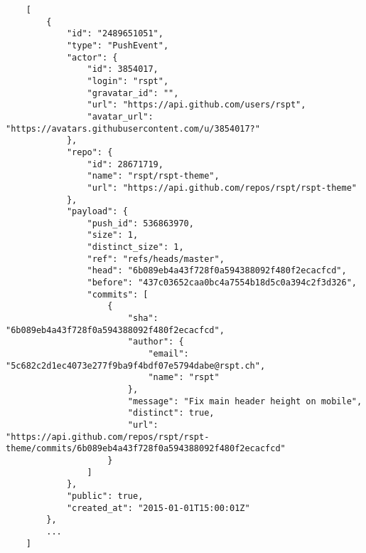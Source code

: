 \begin{verbatim}
    [
        {
            "id": "2489651051",
            "type": "PushEvent",
            "actor": {
                "id": 3854017,
                "login": "rspt",
                "gravatar_id": "",
                "url": "https://api.github.com/users/rspt",
                "avatar_url": "https://avatars.githubusercontent.com/u/3854017?"
            },
            "repo": {
                "id": 28671719,
                "name": "rspt/rspt-theme",
                "url": "https://api.github.com/repos/rspt/rspt-theme"
            },
            "payload": {
                "push_id": 536863970,
                "size": 1,
                "distinct_size": 1,
                "ref": "refs/heads/master",
                "head": "6b089eb4a43f728f0a594388092f480f2ecacfcd",
                "before": "437c03652caa0bc4a7554b18d5c0a394c2f3d326",
                "commits": [
                    {
                        "sha": "6b089eb4a43f728f0a594388092f480f2ecacfcd",
                        "author": {
                            "email": "5c682c2d1ec4073e277f9ba9f4bdf07e5794dabe@rspt.ch",
                            "name": "rspt"
                        },
                        "message": "Fix main header height on mobile",
                        "distinct": true,
                        "url": "https://api.github.com/repos/rspt/rspt-theme/commits/6b089eb4a43f728f0a594388092f480f2ecacfcd"
                    }
                ]
            },
            "public": true,
            "created_at": "2015-01-01T15:00:01Z"
        },
        ...
    ]
\end{verbatim}

